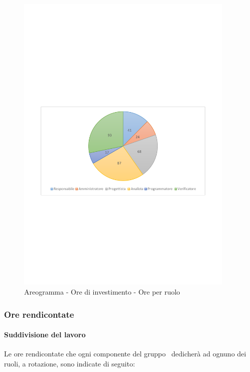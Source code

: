 \documentclass[../PianoProgetto.tex]{subfiles}
\begin{document}
	\begin{figure}[!h]
		\centering
		\includegraphics[width=0.93\textwidth , trim=2cm 9.5cm 2cm 11cm]{grafici/Riepilogo/Investimento/ore-ruolo}
			\caption{Areogramma - Ore di investimento - Ore per ruolo}
		\label{fig:CircleChart-investimento_ore_r}
	\end{figure}
\vfill	
	\subsubsection{Ore rendicontate}
				\paragraph{Suddivisione del lavoro}
					Le ore rendicontate che ogni componente del gruppo \leaf\ dedicherà ad ognuno dei ruoli, a rotazione, sono indicate di seguito:
	
\end{document}
